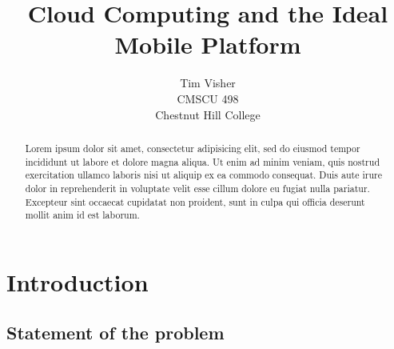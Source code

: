 \documentclass[12pt,oneside,letterpaper,titlepage]{report}
\author{Tim Visher\\ CMSCU 498\\ Chestnut Hill College}
\title{Cloud Computing and the Ideal Mobile Platform}
\begin{document}
\maketitle

\tableofcontents

\newpage

\begin{abstract}

%
%
%
%
%

Lorem ipsum dolor sit amet, consectetur adipisicing elit, sed do eiusmod tempor
incididunt ut labore et dolore magna aliqua. Ut enim ad minim veniam, quis
nostrud exercitation ullamco laboris nisi ut aliquip ex ea commodo
consequat. Duis aute irure dolor in reprehenderit in voluptate velit esse cillum
dolore eu fugiat nulla pariatur. Excepteur sint occaecat cupidatat non proident,
sunt in culpa qui officia deserunt mollit anim id est laborum.

\end{abstract}

\chapter{Introduction}

\newpage

\section{Statement of the problem}
\end{document}
